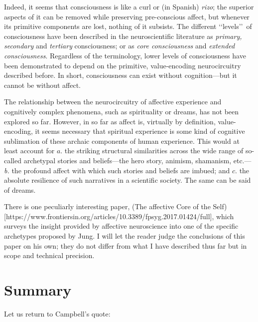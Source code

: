 \documentclass[a4paper]{article}
\begin{document}
Indeed, it seems that consciousness is like a curl or (in Spanish)
\textit{rizo}; the superior aspects of it can be removed while preserving
pre-conscious affect, but whenever its primitive components are lost, nothing of
it subsists. The different \lq\lq levels\rq\rq \ of consciousness have been
described in the neuroscientific literature as \textit{primary, secondary} and
\textit{tertiary} consciousness; or as \textit{core consciousness} and
\textit{extended consciousness}. Regardless of the terminology, lower levels of
consciousness have been demonstrated to depend on the primitive,
value-encoding neurocircuitry described before. In short, consciousness can
exist without cognition---but it cannot be without affect.

The relationship between the neurocircuitry of affective experience and
cognitively complex phenomena, such as spirituality or dreams, has not been
explored so far. However, in so far as affect is, virtually by definition,
value-encoding, it seems necessary that spiritual experience is some kind of
cognitive sublimation of these archaic components of human experience.
This would at least account for $a.$ the striking structural similarities across
the wide range of so-called archetypal stories and beliefs---the hero story,
animism, shamanism, etc.---\textit{b.} the profound affect with which such
stories and beliefs are imbued; and $c$. the absolute resilience of such
narratives in a scientific society. The same can be said of dreams. 

There is one peculiarly interesting paper, (The affective Core of the
Self)[https://www.frontiersin.org/articles/10.3389/fpsyg.2017.01424/full], which
surveys the insight provided by affective neuroscience into one of the specific
archetypes proposed by Jung. I will let the reader judge the conclusions of this
paper on his own; they do not differ from what I have described thus far but in
scope and technical precision.

\section{Summary}

Let us return to Campbell's quote:
\end{document}
